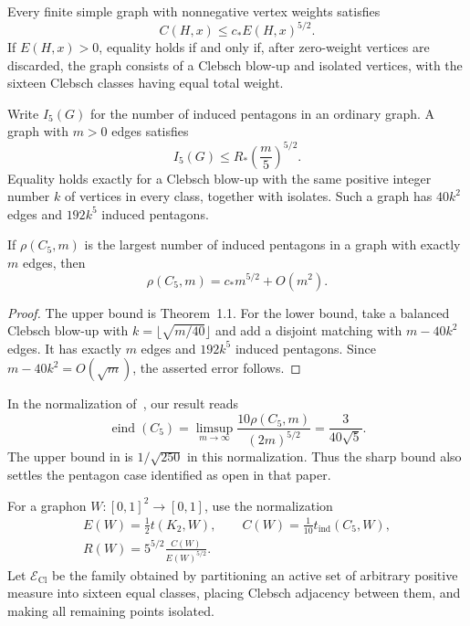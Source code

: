 \begin{theorem}\label{thm:weighted}
Every finite simple graph with nonnegative vertex weights satisfies
\begin{equation}
 C(H,x)\le c_*E(H,x)^{5/2}.\tag{1}\label{eq:weighted}
\end{equation}
If \(E(H,x)>0\), equality holds if and only if, after zero-weight vertices
are discarded, the graph consists of a Clebsch blow-up and isolated vertices,
with the sixteen Clebsch classes having equal total weight.
\end{theorem}

Write \(I_5(G)\) for the number of induced pentagons in an ordinary graph.
A graph with \(m>0\) edges satisfies
\[
 I_5(G)\le R_*\left(\frac m5\right)^{5/2}.
\]
Equality holds exactly for a Clebsch blow-up with the same positive integer
number \(k\) of vertices in every class, together with isolates. Such a
graph has \(40k^2\) edges and \(192k^5\) induced pentagons.

\begin{corollary}\label{cor:asymptotic}
If \(\rho(C_5,m)\) is the largest number of induced pentagons in a graph
with exactly \(m\) edges, then
\[
 \rho(C_5,m)=c_*m^{5/2}+O(m^2).
\]
\end{corollary}
\begin{proof}
The upper bound is Theorem~1.1. For the lower bound, take a balanced
Clebsch blow-up with \(k=\lfloor\sqrt{m/40}\rfloor\) and add a disjoint
matching with \(m-40k^2\) edges. It has exactly \(m\) edges and \(192k^5\)
induced pentagons. Since \(m-40k^2=O(\sqrt m)\), the asserted error follows.
\end{proof}

In the normalization of~\cite{Chao2025}, our result reads
\[
 \operatorname{eind}(C_5)
 =\limsup_{m\to\infty}\frac{10\rho(C_5,m)}{(2m)^{5/2}}
 =\frac{3}{40\sqrt5}.
\]
The upper bound in \cite[Theorem~1.8]{Chao2025} is \(1/\sqrt{250}\) in this
normalization. Thus the sharp bound also settles the pentagon case
identified as open in that paper.

For a graphon \(W:[0,1]^2\to[0,1]\), use the normalization
\[
 \begin{gathered}
 E(W)=\frac12t(K_2,W),\qquad
 C(W)=\frac1{10}t_{\mathrm{ind}}(C_5,W),\\
 R(W)=5^{5/2}\frac{C(W)}{E(W)^{5/2}}.
 \end{gathered}
\]
Let \(\mathcal E_{\mathrm{Cl}}\) be the family obtained by partitioning an
active set of arbitrary positive measure into sixteen equal classes,
placing Clebsch adjacency between them, and making all remaining points
isolated.

